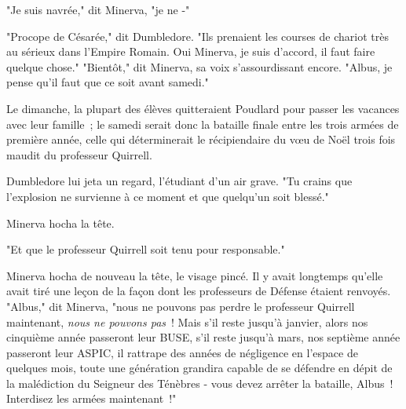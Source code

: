 "Je suis navrée," dit Minerva, "je ne -"

"Procope de Césarée\footnotemark{}," dit Dumbledore. "Ils prenaient les courses de chariot très au sérieux dans l'Empire Romain. Oui Minerva, je suis d'accord, il faut faire quelque chose."
"Bientôt," dit Minerva, sa voix s'assourdissant encore. "Albus, je pense qu'il faut que ce soit avant samedi."

Le dimanche, la plupart des élèves quitteraient Poudlard pour passer les vacances avec leur famille~; le samedi serait donc la bataille finale entre les trois armées de première année, celle qui déterminerait le récipiendaire du vœu de Noël trois fois maudit du professeur Quirrell.

Dumbledore lui jeta un regard, l'étudiant d'un air grave. "Tu crains que l'explosion ne survienne à ce moment et que quelqu'un soit blessé."

Minerva hocha la tête.

"Et que le professeur Quirrell soit tenu pour responsable."

Minerva hocha de nouveau la tête, le visage pincé. Il y avait longtemps qu'elle avait tiré une leçon de la façon dont les professeurs de Défense étaient renvoyés. "Albus," dit Minerva, "nous ne pouvons pas perdre le professeur Quirrell maintenant, \emph{nous ne pouvons pas}~! Mais s'il reste jusqu'à janvier, alors nos cinquième année passeront leur BUSE, s'il reste jusqu'à mars, nos septième année passeront leur ASPIC, il rattrape des années de négligence en l'espace de quelques mois, toute une génération grandira capable de se défendre en dépit de la malédiction du Seigneur des Ténèbres - vous devez arrêter la bataille, Albus~! Interdisez les armées maintenant~!"

